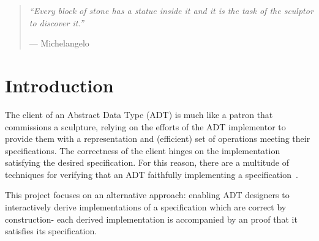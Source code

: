 \begin{quote}
\it
  ``Every block of stone has a statue inside it and it is the task of
  the sculptor to discover it.''

  \par\raggedleft--- \textup{Michelangelo}

\end{quote}

\section{Introduction}

The client of an Abstract Data Type (ADT) is much like a patron that
commissions a sculpture, relying on the efforts of the ADT implementor
to provide them with a representation and (efficient) set of
operations meeting their specifications. The correctness of the
client hinges on the implementation satisfying the desired
specification. For this reason, there are a multitude of techniques
for verifying that an ADT faithfully implementing a
specification~\cite{foo}. 

This project focuses on an alternative approach: enabling ADT
designers to interactively derive implementations of a specification
which are correct by construction- each derived implementation is
accompanied by an proof that it satisfies its specification.
